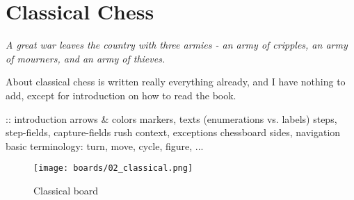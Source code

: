 

\chapter*{Classical Chess}
\label{ch:Classical Chess}

\begin{flushright}
\parbox{0.8\textwidth}{
\emph{A great war leaves the country with three armies -
an army of cripples, an army of mourners, and an army of thieves. \newline
{} } }
\end{flushright}

\noindent
About classical chess is written really everything already, and I
have nothing to add, except for introduction on how to read the book.

\clearpage %

\TODO :: introduction \newline
\textrightarrow arrows \& colors \newline
\textrightarrow markers, texts (enumerations vs. labels) \newline
\textrightarrow steps, step-fields, capture-fields \newline
\textrightarrow rush \newline
\textrightarrow context, exceptions \newline
\textrightarrow chessboard sides, navigation \newline
\textrightarrow basic terminology: turn, move, cycle, figure, ... \newline

\clearpage %

\noindent
\begin{figure}[t]
\texttt{[image: boards/02\_classical.png]}
\caption{Classical board}
\label{fig:02_classical}
\end{figure}

\clearpage %
